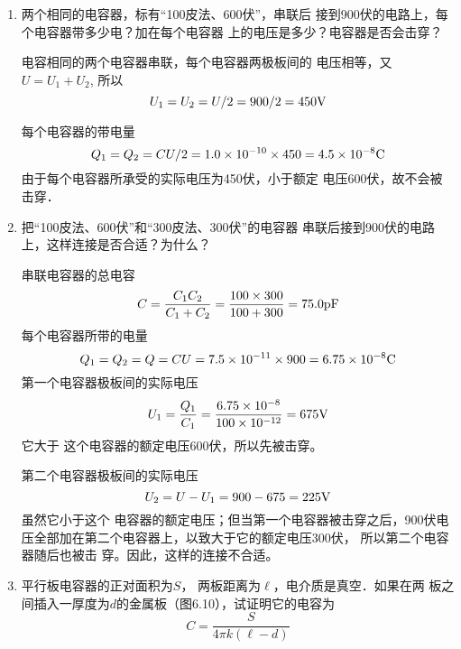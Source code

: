 \begin{enumerate}
\item 两个相同的电容器，标有“100皮法、600伏”，串联后
接到900伏的电路上，每个电容器带多少电？加在每个电容器
上的电压是多少？电容器是否会击穿？

\begin{solution}
    电容相同的两个电容器串联，每个电容器两极板间的
    电压相等，又$U=U_1+U_2$, 所以
   \[ U_1=U_2=U/2=900/2=450{\rm V}\]
 
   每个电容器的带电量
   \[Q_1=Q_2=CU/2=1.0\times10^{-10}\times450=4.5\times10^{-8}{\rm C}\]
    由于每个电容器所承受的实际电压为450伏，小于额定
    电压600伏，故不会被击穿．
\end{solution}

\item 把“100皮法、600伏”和“300皮法、300伏”的电容器
串联后接到900伏的电路上，这样连接是否合适？为什么？

\begin{solution}
    串联电容器的总电容
\[    C=\frac{C_1C_2}{C_1+C_2}=\frac{100\times 300}{100+300}=75.0{\rm pF}\]
    每个电容器所带的电量
\[    Q_1=Q_2=Q=CU=7.5\times10^{-11}\times900=6.75\times10^{-8}{\rm C}\]
    第一个电容器极板间的实际电压
    \[U_1=\frac{Q_1}{C_1}=\frac{6.75\times10^{-8}}{100\times10^{-12}}=675{\rm V}\]
它大于
这个电容器的额定电压600伏，所以先被击穿。

第二个电容器极板间的实际电压
\[U_2=U-U_1=900-675=225{\rm V}\]
虽然它小于这个
电容器的额定电压；但当第一个电容器被击穿之后，900伏电
压全部加在第二个电容器上，以致大于它的额定电压300伏，
所以第二个电容器随后也被击
穿。因此，这样的连接不合适。
\end{solution}

\item 平行板电容器的正对面积为$S$，
两板距离为$\ell$，电介质是真空．如果在两
板之间插入一厚度为$d$的金属板（图6.10），试证明它的电容为
\[C=\frac{S}{4\pi k(\ell-d)}\]
\begin{figure}[htp]\centering


\end{figure}
\end{enumerate}

